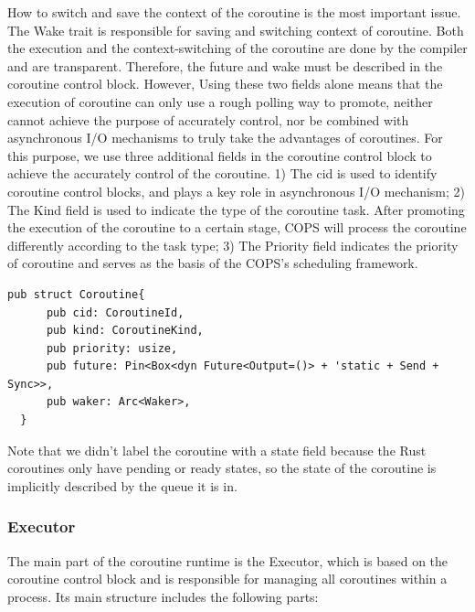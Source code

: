 \documentclass[sigconf,review,anonymous]{acmart}
\begin{document}
How to switch and save the context of the coroutine is the most important issue. The Wake trait is responsible for saving and switching context of coroutine. Both the execution and the context-switching of the coroutine are done by the compiler and are transparent. Therefore, the future and wake must be described in the coroutine control block. However, Using these two fields alone means that the execution of coroutine can only use a rough polling way to promote, neither cannot achieve the purpose of accurately control, nor be combined with asynchronous I/O mechanisms to truly take the advantages of coroutines. For this purpose, we use three additional fields in the coroutine control block to achieve the accurately control of the coroutine. 1) The cid is used to identify coroutine control blocks, and plays a key role in asynchronous I/O mechanism; 2) The Kind field is used to indicate the type of the coroutine task. After promoting the execution of the coroutine to a certain stage, COPS will process the coroutine differently according to the task type; 3) The Priority field indicates the priority of coroutine and serves as the basis of the COPS's scheduling framework.

\begin{lstlisting}[label={ccb},caption={Coroutine control block}]
  pub struct Coroutine{
      pub cid: CoroutineId,
      pub kind: CoroutineKind,
      pub priority: usize,
      pub future: Pin<Box<dyn Future<Output=()> + 'static + Send + Sync>>, 
      pub waker: Arc<Waker>,
  }
  \end{lstlisting}

Note that we didn't label the coroutine with a state field because the Rust coroutines only have pending or ready states, so the state of the coroutine is implicitly described by the queue it is in.


\subsubsection{Executor}
\label{subsubsection: executor}

The main part of the coroutine runtime is the Executor, which is based on the coroutine control block and is responsible for managing all coroutines within a process. Its main structure includes the following parts:
\end{document}
